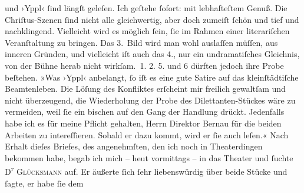 \begin{ledgroupsized}[t]{13cm}
               und ›Yppl‹ ſind längſt geleſen. Ich geſtehe
               ſofort: mit lebhafteſtem Genuß. Die Chriſtus-Szenen ſind nicht alle gleichwertig, aber doch zumeiſt ſchön und tief
               und nachklingend. Vielleicht wird es möglich ſein, ſie im Rahmen einer {\pb}literariſchen Veranſtaltung zu bringen.
               Das 3. Bild wird man wohl auslaſſen müſſen, aus inneren Gründen, und vielleicht iſt
               auch das 4., nur ein undramatiſches Gleichnis, von der Bühne herab nicht
                  wirkſam. 1.{ }2.{ }5. und 6 dürften jedoch ihre Probe beſtehen.\pend
           \pstart
           »Was ›Yppl‹ anbelangt, ſo iſt es eine gute
               Satire auf das kleinſtädtiſche Beamtenleben. Die Löſung des Konfliktes erſcheint mir
               freilich gewaltſam und nicht überzeugend, die Wiederholung der Probe des
               Dilettanten-Stückes wäre zu vermeiden, weil ſie ein bischen auf den Gang der Handlung
               drückt. Jedenfalls habe ich es für meine Pflicht gehalten, Herrn Direktor Bernau für die beiden Arbeiten zu intereſſieren.
               Sobald er dazu kommt, wird er ſie auch leſen.«\pend
           \pstart
           Nach Erhalt dieſes Briefes, des angenehmſten, den ich noch in Theaterdingen bekommen
               habe, begab ich mich – heut vormittags – in das Theater und ſuchte D\textsuperscript{r}{ }\textsc{Glücksmann} auf. Er äußerte ſich ſehr liebenswürdig {\pb}über beide Stücke und ſagte, er habe ſie dem

\end{ledgroupsized}
